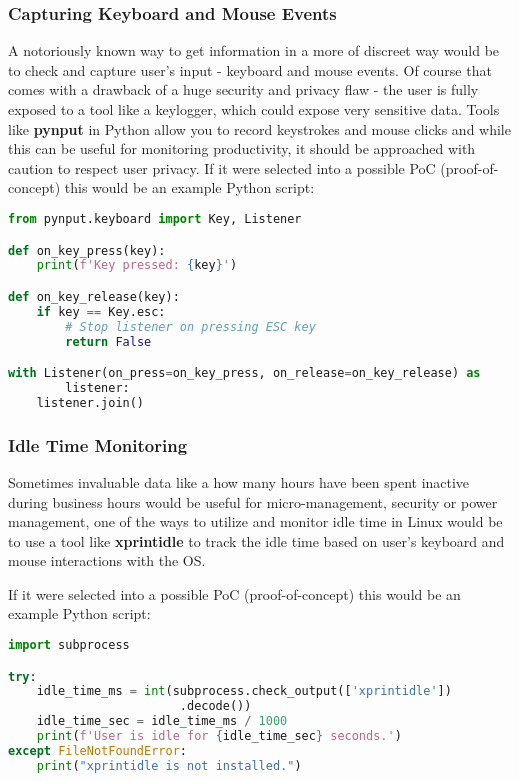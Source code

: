 \documentclass{VUMIFPSmagistrinis}
\begin{document}
\subsubsection{Capturing Keyboard and Mouse Events}
A notoriously known way to get information in a more of discreet way would be to check and capture user's input - keyboard and mouse events. Of course that comes with a drawback of a huge security and privacy flaw - the user is fully exposed to a tool like a keylogger, which could expose very sensitive data. Tools like \textbf{pynput} in Python allow you to record keystrokes and mouse clicks and while this can be useful for monitoring productivity, it should be approached with caution to respect user privacy. If it were selected into a possible PoC (proof-of-concept) this would be an example Python script:
\begin{lstlisting}[language=Python]
from pynput.keyboard import Key, Listener

def on_key_press(key):
    print(f'Key pressed: {key}')

def on_key_release(key):
    if key == Key.esc:
        # Stop listener on pressing ESC key
        return False

with Listener(on_press=on_key_press, on_release=on_key_release) as 
        listener:
    listener.join()
\end{lstlisting}

\subsubsection{Idle Time Monitoring}
Sometimes invaluable data like a how many hours have been spent inactive during business hours would be useful for micro-management, security or power management, one of the ways to utilize and monitor idle time in Linux would be to use a tool like \textbf{xprintidle} to track the idle time based on user's keyboard and mouse interactions with the OS.

If it were selected into a possible PoC (proof-of-concept) this would be an example Python script:
\begin{lstlisting}[language=Python]
import subprocess

try:
    idle_time_ms = int(subprocess.check_output(['xprintidle'])
                        .decode())
    idle_time_sec = idle_time_ms / 1000
    print(f'User is idle for {idle_time_sec} seconds.')
except FileNotFoundError:
    print("xprintidle is not installed.")
\end{lstlisting}
\end{document}
